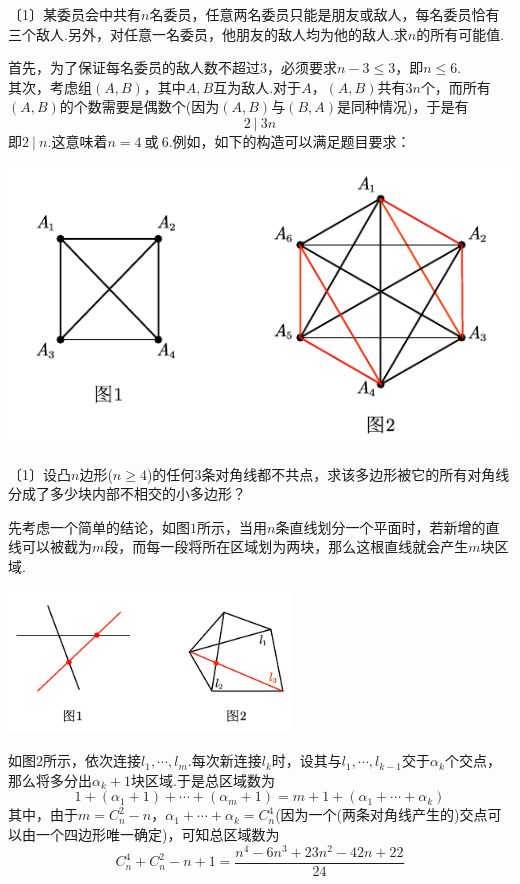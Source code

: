 \documentclass[lang=cn, zihao=4.5]{elegantbook}
\newcommand{\nd}[1]{〔#1〕}
\begin{document}
\begin{example} %
	\nd{1}某委员会中共有$n$名委员，任意两名委员只能是朋友或敌人，每名委员恰有三个敌人.另外，对任意一名委员，他朋友的敌人均为他的敌人.求$n$的所有可能值.
\end{example}
\begin{solution}
	首先，为了保证每名委员的敌人数不超过$3$，必须要求$n-3 \leq 3$，即$n \leq 6$. \\
	其次，考虑组$(A,B)$，其中$A,B$互为敌人.对于$A$，$(A,B)$共有$3n$个，而所有$(A,B)$的个数需要是偶数个(因为$(A,B)$与$(B,A)$是同种情况)，于是有$$2~|~3n$$即$2~|~n$.这意味着$n=4~ \textit{或} ~6$.例如，如下的构造可以满足题目要求：
	\begin{center}
			\includegraphics{attachment/202302082.pdf}
	\end{center}
\end{solution}

\begin{example} %
	\nd{1}设凸$n$边形($n \geq 4$)的任何$3$条对角线都不共点，求该多边形被它的所有对角线分成了多少块内部不相交的小多边形？
\end{example}
\begin{solution}
	\begin{guess}
		先考虑一个简单的结论，如图$1$所示，当用$n$条直线划分一个平面时，若新增的直线可以被截为$m$段，而每一段将所在区域划为两块，那么这根直线就会产生$m$块区域.
	\end{guess}
	\begin{center}
			\includegraphics[width=7.5cm]{attachment/202302083.pdf}
	\end{center}
	如图$2$所示，依次连接$l_1, \cdots ,l_m$.每次新连接$l_k$时，设其与$l_1, \cdots ,l_{k-1}$交于$\alpha _k$个交点，那么将多分出$\alpha _k+1$块区域.于是总区域数为$$1 + (\alpha _1 +1) + \cdots + (\alpha _m + 1) = m+1 +(\alpha _1 + \cdots + \alpha _k)$$
	其中，由于$m=C_n^2-n$，$\alpha _1 + \cdots + \alpha _k = C_n^4$(因为一个(两条对角线产生的)交点可以由一个四边形唯一确定)，可知总区域数为$$C_n^4+C_n^2-n+1 = \frac{n^4 - 6n^3 + 23n^2 - 42n + 22}{24}$$
\end{solution}
\end{document}
